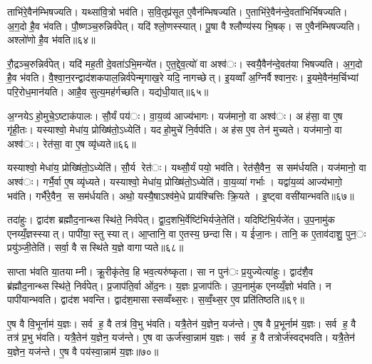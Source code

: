 ताभि॑रे॒वैन॑म्भिषज्यति। यथ्सा॑वि॒त्रो भव॑ति। स॒वि॒तृप्र॑सूत ए॒वैन॑म्भिषज्यति। ए॒ताभि॑रे॒वैन॑न्दे॒वता॑भिर्भिषज्यति। अ॒ग॒दो है॒व भ॑वति। पौ॒ष्णञ्च॒रुन्निर्व॑पेत्। यदि॑ श्लो॒णस्स्यात्। पू॒षा वै श्लौण्य॑स्य भि॒षक्। स ए॒वैन॑म्भिषज्यति। अश्लो॑णो है॒व भ॑वति॥६४॥

रौ॒द्रञ्च॒रुन्निर्व॑पेत्। यदि॑ मह॒ती दे॒वता॑ऽभि॒मन्ये॑त। ए॒त॒द्दे॒व॒त्यो॑ वा अश्व॑ः। स्वयै॒वैन॑न्दे॒वत॑या भिषज्यति। अ॒ग॒दो है॒व भ॑वति। वै॒श्वा॒न॒रन्द्वाद॑शकपाल॒न्निर्व॑पेन्मृगाख॒रे यदि॒ नागच्छेत्। इ॒यव्वाँ अ॒ग्निर्वैश्वान॒रः। इ॒यमे॒वैन॑म॒र्चिभ्यां परि॒रोध॒मान॑यति। आहै॒व सुत्य॒मह॑र्गच्छति। यद्य॑धी॒यात्॥६५॥

अ॒ग्नयेऽहो॒मुचे॒ऽष्टाक॑पालः। सौ॒र्यं पय॑ः। वा॒य॒व्य॑ आज्य॑भागः। यज॑मानो॒ वा अश्व॑ः। अह॑सा॒ वा ए॒ष गृ॑ही॒तः। यस्याश्वो॒ मेधा॑य॒ प्रोख्षि॑तो॒ऽध्येति॑। यदहो॒मुचे॑ नि॒र्वप॑ति। अह॑स ए॒व तेन॑ मुच्यते। यज॑मानो॒ वा अश्व॑ः। रेत॑सा॒ वा ए॒ष व्यृ॑ध्यते॥६६॥

यस्याश्वो॒ मेधा॑य॒ प्रोख्षि॑तो॒ऽध्येति॑। सौ॒र्य रेत॑ः। यथ्सौ॒र्यं पयो॒ भव॑ति। रेत॑सै॒वैन॒ स सम॑र्धयति। यज॑मानो॒ वा अश्व॑ः। गर्भै॒र्वा ए॒ष व्यृ॑ध्यते। यस्याश्वो॒ मेधा॑य॒ प्रोख्षि॑तो॒ऽध्येति॑। वा॒य॒व्या॑ गर्भाः। यद्वा॑य॒व्य॑ आज्य॑भागो॒ भव॑ति। गर्भै॑रे॒वैन॒ स सम॑र्धयति। अथो॒ यस्यै॒षाऽश्व॑मे॒धे प्राय॑श्चित्तिः क्रि॒यते। इ॒ष्ट्वा वसी॑यान्भवति॥६७॥


तदा॑हुः। द्वाद॑श ब्रह्मौद॒नान्थ्सस्थि॑ते॒ निर्व॑पेत्। द्वा॒द॒शभि॒र्वेष्टि॑भिर्यजे॒तेति॑। यदिष्टि॑भि॒र्यजे॑त। उ॒प॒नामु॑क एनय्यँ॒ज्ञस्स्यात्। पापी॑या॒स्तु स्यात्। आ॒प्तानि॒ वा ए॒तस्य॒ छन्दासि। य ई॑जा॒नः। तानि॒ क ए॒ताव॑दाशु॒ पुन॒ः प्रयु॑ञ्जी॒तेति॑। सर्वा॒ वै सस्थि॑ते य॒ज्ञे वागाप्यते॥६८॥

साप्ता भ॑वति या॒तयाम्नी। क्रू॒रीकृ॑तेव॒ हि भव॒त्यरु॑ष्कृता। सा न पुन॑ः प्र॒युज्येत्या॑हुः। द्वाद॑शै॒व ब्र॑ह्मौद॒नान्थ्सस्थि॑ते॒ निर्व॑पेत्। प्र॒जाप॑ति॒र्वा ओ॑द॒नः। य॒ज्ञः प्र॒जाप॑तिः। उ॒प॒नामु॑क एनय्यँ॒ज्ञो भ॑वति। न पापी॑यान्भवति। द्वाद॑श भवन्ति। द्वाद॑श॒मासास्सव्वँथ्स॒रः। स॒व्वँ॒थ्स॒र ए॒व प्रति॑तिष्ठति॥६९॥


ए॒ष वै वि॒भूर्नाम॑ य॒ज्ञः। सर्व ह॒ वै तत्र॑ वि॒भु भ॑वति। यत्रै॒तेन॑ य॒ज्ञेन॒ यज॑न्ते। ए॒ष वै प्र॒भूर्नाम॑ य॒ज्ञः। सर्व ह॒ वै तत्र॑ प्र॒भु भ॑वति। यत्रै॒तेन॑ य॒ज्ञेन॒ यज॑न्ते। ए॒ष वा ऊर्ज॑स्वा॒न्नाम॑ य॒ज्ञः। सर्व ह॒ वै तत्रोर्ज॑स्वद्भवति। यत्रै॒तेन॑ य॒ज्ञेन॒ यज॑न्ते। ए॒ष वै पय॑स्वा॒न्नाम॑ य॒ज्ञः॥७०॥

